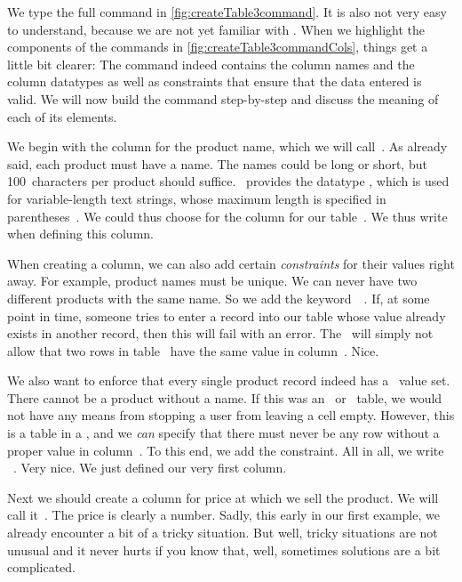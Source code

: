 We type the full  command in \cref{fig:createTable3command}.
It is also not very easy to understand, because we are not yet familiar with \sql.
When we highlight the components of the commands in \cref{fig:createTable3commandCols}, things get a little bit clearer:
The command indeed contains the column names and the column datatypes as well as constraints that ensure that the data entered is valid.
We will now build the command step-by-step and discuss the meaning of each of its elements.

We begin with the column for the product name, which we will call~.
As already said, each product must have a name.
The names could be long or short, but 100~characters per product should suffice.
\sql\ provides the datatype , which is used for variable-length text strings, whose maximum length is specified in parentheses~\cite{PGDG:PD:CT}.
We could thus choose  for the column  for our table~.
We thus write~ when defining this column.

When creating a column, we can also add certain \emph{constraints} for their values right away.
For example, product names must be unique.
We can never have two different products with the same name.
So we add the keyword~~\cite{PGDG:PD:C}.
If, at some point in time, someone tries to enter a record into our table whose  value already exists in another record, then this will fail with an error.
The \dbms\ will simply not allow that two rows in table~ have the same value in column~.
Nice.

We also want to enforce that every single product record indeed has a~ value set.
There cannot be a product without a name.
If this was an \microsoftExcel\ or \libreofficeCalc\ table, we would not have any means from stopping a user from leaving a cell empty.
However, this is a table in a , and we \emph{can} specify that there must never be any row without a proper value in column~.
To this end, we add the  constraint.
All in all, we write ~\cite{PGDG:PD:C}.
Very nice.
We just defined our very first column.

Next we should create a column for price at which we sell the product.
We will call it~.
The price is clearly a number.
Sadly, this early in our first example, we already encounter a bit of a tricky situation.
But well, tricky situations are not unusual and it never hurts if you know that, well, sometimes solutions are a bit complicated.

